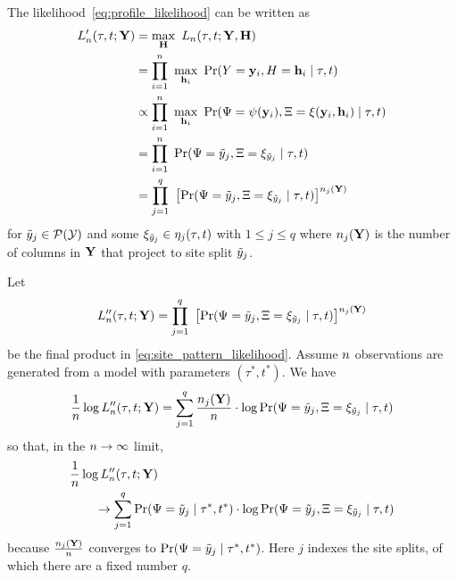 The likelihood~\eqref{eq:profile_likelihood} can be written as
\begin{align}
L_\nCols'(\tau, t; \fullAlignment) &= \max_{\fullAncestralStates} \ L_\nCols(\tau, t; \fullAlignment, \fullAncestralStates) \nonumber \\
                             &= \prod_{i=1}^{\nCols} \ \max_{\ancestralStateColumn_i} \ \Pr(\alignmentColumnRV=\alignmentColumn_i, \ancestralStateColumnRV=\ancestralStateColumn_i \mid \tau, t) \nonumber \\
                             &\propto \prod_{i=1}^{\nCols} \ \max_{\ancestralStateColumn_i} \ \Pr(\siteSplitRV=\patternToSplit(\alignmentColumn_i), \ancestralSplitRV=\ancestralToSplit(\alignmentColumn_i, \ancestralStateColumn_i) \mid \tau, t) \nonumber \\
                             &= \prod_{i=1}^{\nCols} \ \Pr(\siteSplitRV=\siteSplit_j, \ancestralSplitRV=\xi_{\siteSplit_j} \mid \tau, t) \nonumber \\
                             &= \prod_{j=1}^{\nSiteSplits} \ \left[\Pr(\siteSplitRV=\siteSplit_j, \ancestralSplitRV=\xi_{\siteSplit_j} \mid \tau, t)\right] ^{\nCols_j(\fullAlignment)} \label{eq:site_pattern_likelihood}
\end{align}
for $\tilde{y}_j\in\mathcal{P}(\mathcal{Y})$ and some $\xi_{\tilde{y}_j}\in\eta_j(\tau, t)$ with $1 \le j \le q$ where $n_j(\mathbf{Y})$ is the number of columns in $\mathbf{Y}$ that project to site split $\tilde{y}_j$.

Let
\[
L_n''(\tau, t; \mathbf{Y}) = \prod_{j=1}^{q} \ \left[\Pr(\Psi=\tilde{y}_j, \Xi=\xi_{\tilde{y}_j} \mid \tau, t)\right] ^{n_j(\mathbf{Y})}
\]
be the final product in \eqref{eq:site_pattern_likelihood}.
Assume $n$ observations are generated from a model with parameters $(\tau^*, t^*)$.
We have
\begin{equation*}
\frac{1}{n} \log L_n''(\tau, t; \mathbf{Y}) = \sum_{j=1}^q \frac{n_j(\mathbf{Y})}{n}\cdot  \log \Pr(\Psi=\tilde{y}_j, \Xi=\xi_{\tilde{y}_j} \mid \tau, t)
\end{equation*}
so that, in the $n\rightarrow\infty$ limit,
\begin{equation}
\begin{split}
&    \frac{1}{n} \log L_n''(\tau, t; \mathbf{Y}) \\
&\qquad \rightarrow \sum_{j=1}^q \Pr(\Psi=\tilde{y}_j \mid \tau^*, t^*) \cdot \log \Pr(\Psi=\tilde{y}_j, \Xi=\xi_{\tilde{y}_j} \mid \tau, t) \label{eq:site_pattern_profile_likelihood_mean}
\end{split}
\end{equation}
because
$\frac{n_j(\mathbf{Y})}{n}$ converges to $\Pr(\Psi=\tilde{y}_j \mid \tau^*, t^*)$.
Here $j$ indexes the site splits, of which there are a fixed number $q$.


